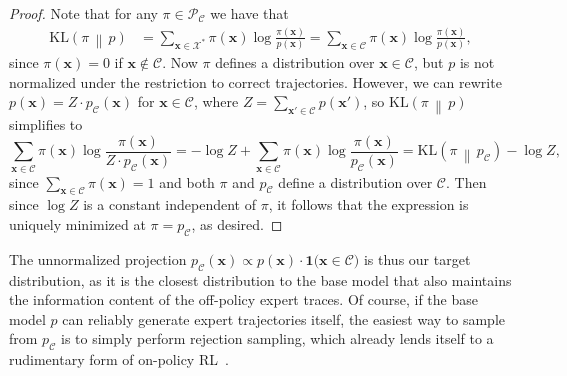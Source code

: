 \documentclass{article}
\begin{document}
\begin{proof}
Note that for any $\pi \in \mathcal{P}_{\mathcal{C}}$ we have that \[
\begin{aligned}
    \mathrm{KL}\!\left(
        \pi
        \,\middle\|\,
        p
    \right)
    &=
    \sum_{\mathbf{x}\in \mathcal{X}^*}
    \pi(\mathbf{x})
    \log
    \frac{
        \pi(\mathbf{x})
    }{
        p(\mathbf{x})
    }
    =
    \sum_{\mathbf{x}\in \mathcal{C}}
    \pi(\mathbf{x})
    \log
    \frac{
        \pi(\mathbf{x})
    }{
        p(\mathbf{x})
    },
\end{aligned}
\]
since $\pi(\mathbf{x}) = 0$ if $\mathbf{x} \notin \mathcal{C}$. Now $\pi$ defines a distribution over $\mathbf{x} \in \mathcal{C}$, but $p$ is not normalized under the restriction to correct trajectories. However, we can rewrite $p(\mathbf{x}) = Z \cdot p_{\mathcal{C}}(\mathbf{x})$ for $\mathbf{x} \in \mathcal{C}$, where $Z = \sum_{\mathbf{x}'\in \mathcal{C}} p(\mathbf{x}')$, so $\mathrm{KL}\!\left(
        \pi
        \,\middle\|\,
        p
    \right)$ simplifies to 
 \begin{equation}\label{eq:equiv}
    \sum_{\mathbf{x}\in \mathcal{C}}
    \pi(\mathbf{x})
    \log
    \frac{
        \pi(\mathbf{x})
    }{
        Z \cdot p_{\mathcal{C}}(\mathbf{x})
    }
    =-\log Z  + \sum_{\mathbf{x}\in \mathcal{C}}
    \pi(\mathbf{x})
    \log
    \frac{
        \pi(\mathbf{x})
    }{
        p_{\mathcal{C}}(\mathbf{x})
    } = \mathrm{KL}\!\left(
        \pi
        \,\middle\|\,
        p_{\mathcal{C}}
    \right) -\log Z,
\end{equation}
since $\sum_{\mathbf{x}\in \mathcal{C}} \pi(\mathbf{x}) = 1$ and both $\pi$ and $p_{\mathcal{C}}$ define a distribution over $\mathcal{C}$. Then since $\log Z$ is a constant independent of $\pi$, it follows that the expression is uniquely minimized at $\pi = p_{\mathcal{C}}$, as desired.
\end{proof}

The unnormalized projection $p_{\mathcal{C}}(\mathbf{x}) \propto p(\mathbf{x}) \cdot \mathbf{1}\bigl(\mathbf{x} \in \mathcal{C}\bigr)$ is thus our target distribution, as it is the closest distribution to the base model that also maintains the information content of the off-policy expert traces. Of course, if the base model $p$ can reliably generate expert trajectories itself, the easiest way to sample from $p_{\mathcal{C}}$ is to simply perform rejection sampling, which already lends itself to a rudimentary form of on-policy RL~\citep{xiong2025minimalist}.
\end{document}
